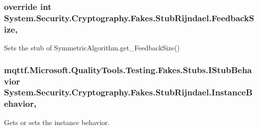 \hypertarget{class_system_1_1_security_1_1_cryptography_1_1_fakes_1_1_stub_rijndael_ac80889cf4a206edd1ada2f35c4c150dc}{
\subsubsection[{Feedback\-Size}]{\setlength{\rightskip}{0pt plus 5cm}override int System.\-Security.\-Cryptography.\-Fakes.\-Stub\-Rijndael.\-Feedback\-Size\hspace{0.3cm}{\ttfamily [get]}, {\ttfamily [set]}}}\label{class_system_1_1_security_1_1_cryptography_1_1_fakes_1_1_stub_rijndael_ac80889cf4a206edd1ada2f35c4c150dc}


Sets the stub of Symmetric\-Algorithm.\-get\-\_\-\-Feedback\-Size()

\hypertarget{class_system_1_1_security_1_1_cryptography_1_1_fakes_1_1_stub_rijndael_a9893cdbce009bbb4dd310640bb6fb68a}{
\subsubsection[{Instance\-Behavior}]{\setlength{\rightskip}{0pt plus 5cm}mqttf.\-Microsoft.\-Quality\-Tools.\-Testing.\-Fakes.\-Stubs.\-I\-Stub\-Behavior System.\-Security.\-Cryptography.\-Fakes.\-Stub\-Rijndael.\-Instance\-Behavior\hspace{0.3cm}{\ttfamily [get]}, {\ttfamily [set]}}}\label{class_system_1_1_security_1_1_cryptography_1_1_fakes_1_1_stub_rijndael_a9893cdbce009bbb4dd310640bb6fb68a}


Gets or sets the instance behavior.

